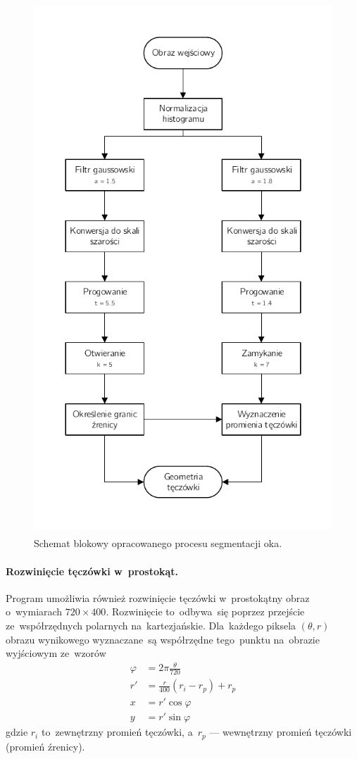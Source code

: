 \documentclass[11pt,a4paper]{article}
\begin{document}
\begin{figure}
    \centering
    \includegraphics[height=20cm]{res/img/diagram.pdf}
    \caption{Schemat blokowy opracowanego procesu segmentacji oka.}
    \label{fig:block-diagram}
\end{figure}

\paragraph{Rozwinięcie tęczówki w~prostokąt.}
Program umożliwia również rozwinięcie tęczówki w~prostokątny obraz o~wymiarach $720 \times 400$.
Rozwinięcie to~odbywa~się poprzez przejście ze~współrzędnych polarnych na~kartezjańskie.
Dla~każdego piksela $(\theta,r)$ obrazu wynikowego wyznaczane~są współrzędne tego~punktu na~obrazie wyjściowym ze~wzorów
\begin{align*}
    \varphi &= 2 \pi \frac{\theta}{720} \\
    r' &= \frac{r}{400} (r_i - r_p) + r_p \\
    x &= r' \cos \varphi \\
    y &= r' \sin \varphi
\end{align*}
gdzie $r_i$ to~zewnętrzny promień tęczówki, a~$r_p$ --- wewnętrzny promień tęczówki (promień źrenicy).
\end{document}
